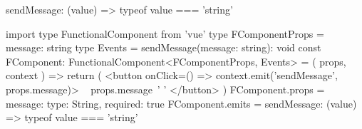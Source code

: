 \begin{paracol}{2}
\begin{codeHtml}
{  sendMessage: (value) => typeof value === 'string'
}
\end{codeHtml}
\switchcolumn
\begin{codeHtml}
import type { FunctionalComponent } from 'vue'
type FComponentProps = {
  message: string
}
type Events = {
  sendMessage(message: string): void
}
const FComponent: FunctionalComponent<FComponentProps, Events> = (
  props,
  context
) => {
  return (
    <button onClick={() => context.emit('sendMessage', props.message)}>
        {props.message} {' '}
    </button>
  )
}
FComponent.props = {
  message: {
    type: String,
    required: true
  }
}
FComponent.emits = {
  sendMessage: (value) => typeof value === 'string'
}
\end{codeHtml}
\end{paracol}
 
